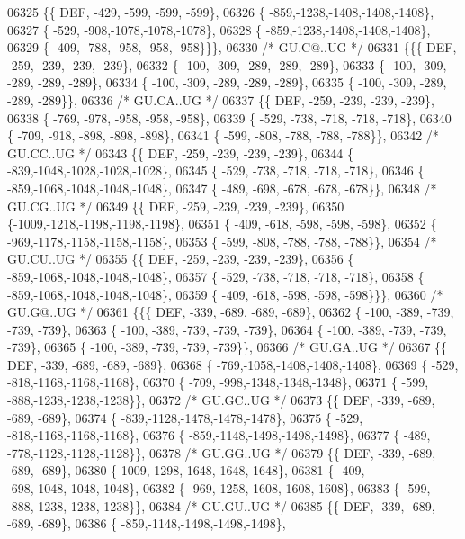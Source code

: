 \begin{DoxyCode}
06325 \{\{  DEF, -429, -599, -599, -599\},
06326 \{ -859,-1238,-1408,-1408,-1408\},
06327 \{ -529, -908,-1078,-1078,-1078\},
06328 \{ -859,-1238,-1408,-1408,-1408\},
06329 \{ -409, -788, -958, -958, -958\}\}\},
06330 \textcolor{comment}{/* GU.C@..UG */}
06331 \{\{\{  DEF, -259, -239, -239, -239\},
06332 \{ -100, -309, -289, -289, -289\},
06333 \{ -100, -309, -289, -289, -289\},
06334 \{ -100, -309, -289, -289, -289\},
06335 \{ -100, -309, -289, -289, -289\}\},
06336 \textcolor{comment}{/* GU.CA..UG */}
06337 \{\{  DEF, -259, -239, -239, -239\},
06338 \{ -769, -978, -958, -958, -958\},
06339 \{ -529, -738, -718, -718, -718\},
06340 \{ -709, -918, -898, -898, -898\},
06341 \{ -599, -808, -788, -788, -788\}\},
06342 \textcolor{comment}{/* GU.CC..UG */}
06343 \{\{  DEF, -259, -239, -239, -239\},
06344 \{ -839,-1048,-1028,-1028,-1028\},
06345 \{ -529, -738, -718, -718, -718\},
06346 \{ -859,-1068,-1048,-1048,-1048\},
06347 \{ -489, -698, -678, -678, -678\}\},
06348 \textcolor{comment}{/* GU.CG..UG */}
06349 \{\{  DEF, -259, -239, -239, -239\},
06350 \{-1009,-1218,-1198,-1198,-1198\},
06351 \{ -409, -618, -598, -598, -598\},
06352 \{ -969,-1178,-1158,-1158,-1158\},
06353 \{ -599, -808, -788, -788, -788\}\},
06354 \textcolor{comment}{/* GU.CU..UG */}
06355 \{\{  DEF, -259, -239, -239, -239\},
06356 \{ -859,-1068,-1048,-1048,-1048\},
06357 \{ -529, -738, -718, -718, -718\},
06358 \{ -859,-1068,-1048,-1048,-1048\},
06359 \{ -409, -618, -598, -598, -598\}\}\},
06360 \textcolor{comment}{/* GU.G@..UG */}
06361 \{\{\{  DEF, -339, -689, -689, -689\},
06362 \{ -100, -389, -739, -739, -739\},
06363 \{ -100, -389, -739, -739, -739\},
06364 \{ -100, -389, -739, -739, -739\},
06365 \{ -100, -389, -739, -739, -739\}\},
06366 \textcolor{comment}{/* GU.GA..UG */}
06367 \{\{  DEF, -339, -689, -689, -689\},
06368 \{ -769,-1058,-1408,-1408,-1408\},
06369 \{ -529, -818,-1168,-1168,-1168\},
06370 \{ -709, -998,-1348,-1348,-1348\},
06371 \{ -599, -888,-1238,-1238,-1238\}\},
06372 \textcolor{comment}{/* GU.GC..UG */}
06373 \{\{  DEF, -339, -689, -689, -689\},
06374 \{ -839,-1128,-1478,-1478,-1478\},
06375 \{ -529, -818,-1168,-1168,-1168\},
06376 \{ -859,-1148,-1498,-1498,-1498\},
06377 \{ -489, -778,-1128,-1128,-1128\}\},
06378 \textcolor{comment}{/* GU.GG..UG */}
06379 \{\{  DEF, -339, -689, -689, -689\},
06380 \{-1009,-1298,-1648,-1648,-1648\},
06381 \{ -409, -698,-1048,-1048,-1048\},
06382 \{ -969,-1258,-1608,-1608,-1608\},
06383 \{ -599, -888,-1238,-1238,-1238\}\},
06384 \textcolor{comment}{/* GU.GU..UG */}
06385 \{\{  DEF, -339, -689, -689, -689\},
06386 \{ -859,-1148,-1498,-1498,-1498\},

\end{DoxyCode}
